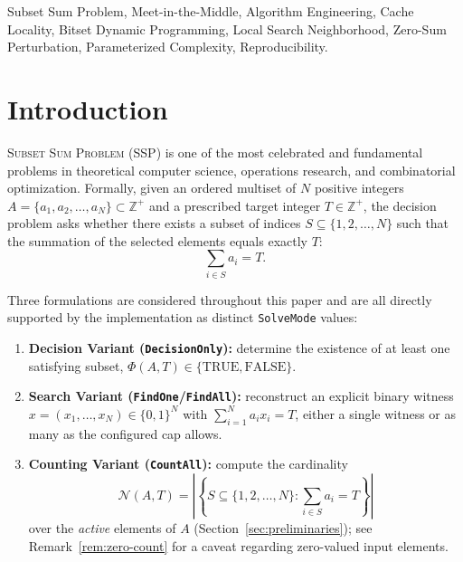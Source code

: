 \documentclass[journal,onecolumn,11pt]{IEEEtran}
\begin{document}
\begin{IEEEkeywords}
Subset Sum Problem, Meet-in-the-Middle, Algorithm Engineering, Cache Locality, Bitset Dynamic Programming, Local Search Neighborhood, Zero-Sum Perturbation, Parameterized Complexity, Reproducibility.
\end{IEEEkeywords}

\section{Introduction}
\label{sec:introduction}

 \textsc{Subset Sum Problem} (SSP) is one of the most celebrated and fundamental problems in theoretical computer science, operations research, and combinatorial optimization. Formally, given an ordered multiset of $N$ positive integers $A = \{a_1, a_2, \dots, a_N\} \subset \mathbb{Z}^+$ and a prescribed target integer $T \in \mathbb{Z}^+$, the decision problem asks whether there exists a subset of indices $S \subseteq \{1, 2, \dots, N\}$ such that the summation of the selected elements equals exactly $T$:
\begin{equation}
    \sum_{i \in S} a_i = T.
    \label{eq:ssp_core}
\end{equation}

Three formulations are considered throughout this paper and are all directly supported by the implementation as distinct \texttt{SolveMode} values:
\begin{enumerate}
    \item \textbf{Decision Variant (\texttt{DecisionOnly}):} determine the existence of at least one satisfying subset, $\Phi(A, T) \in \{\text{TRUE}, \text{FALSE}\}$.
    \item \textbf{Search Variant (\texttt{FindOne}/\texttt{FindAll}):} reconstruct an explicit binary witness $x = (x_1, \dots, x_N) \in \{0, 1\}^N$ with $\sum_{i=1}^N a_i x_i = T$, either a single witness or as many as the configured cap allows.
    \item \textbf{Counting Variant (\texttt{CountAll}):} compute the cardinality
    \begin{equation}
        \mathcal{N}(A, T) = \left| \left\{ S \subseteq \{1, 2, \dots, N\} : \sum_{i \in S} a_i = T \right\} \right|
    \end{equation}
    over the \emph{active} elements of $A$ (Section~\ref{sec:preliminaries}); see Remark~\ref{rem:zero-count} for a caveat regarding zero-valued input elements.
\end{enumerate}
\end{document}
